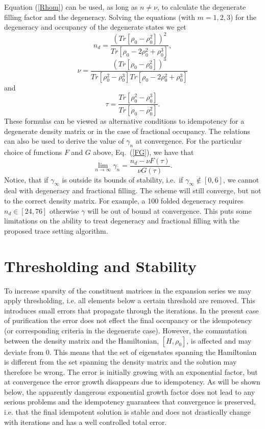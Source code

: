 \commentoutA{\documentclass[superbib,aps,prb,epsfig,floats,twocolumn]{revtex4}}
\begin{document}
Equation (\ref{Rhom}) can be used, as long as
$n \neq \nu$, to calculate the degenerate filling factor and the degeneracy.
Solving the equations (with $m=1,2,3$) for the degeneracy and occupancy
of the degenerate states we get
\begin{equation}
n_d = \frac{(Tr [\rho_0-\rho_0^2 ])^2}{Tr [\rho_0-2\rho_0^2+\rho_0^3 ]},
\end{equation}
\begin{equation}
\nu = \frac{(Tr [\rho_0-\rho_0^2 ])^3}{Tr [\rho_0^2-\rho_0^3 ]Tr [\rho_0-2\rho_0^2+\rho_0^3 ]}
\end{equation}
and
\begin{equation}
\tau = \frac{Tr [\rho_0^2-\rho_0^3 ]}{Tr [\rho_0-\rho_0^2 ]}.
\end{equation}
These formulas can be viewed as alternative conditions to idempotency
for a degenerate density matrix or in the case of fractional occupancy. 
The relations can also be used
to derive the value of $\gamma_n$ at convergence. For the particular
choice of functions $F$ and $G$ above, Eq.\ (\ref{FG}), we have that
\begin{equation}
\lim_{n \rightarrow \infty} \gamma_n = \frac{n_d - \nu F(\tau )}
                                               {\nu G(\tau )}.
\end{equation}
Notice, that if $\gamma_{\infty}$
is outside its bounds of stability, i.e.\ if $\gamma_{\infty} \notin [0,6]$, we cannot deal with
degeneracy and fractional filling. The scheme will still
converge, but not to the correct density matrix. For example,
a 100 folded degeneracy requires $n_d \in [24,76]$ otherwise
$\gamma$ will be out of bound at convergence. This puts some
limitations on the ability to treat degeneracy and fractional filling
with the proposed trace setting algorithm.


\section{Thresholding and Stability}

To increase sparsity of the constituent matrices in the expansion series
we may apply thresholding, i.e. all elements below a certain threshold
are removed. This introduces small errors that propagate through the
iterations. In the present case of purification the error does not
effect the final occupancy or the idempotency (or corresponding criteria
in the degenerate case). However, the commutation between the density
matrix and the Hamiltonian, $[H,\rho_0]$, is affected and may deviate from $0$. 
This means that the set of eigenstates spanning the Hamiltonian is different 
from the set spanning the density matrix and the solution may therefore be wrong.
The error is initially growing with an exponential factor, but at convergence
the error growth disappears due to idempotency.
As will be shown below, the apparently dangerous exponential 
growth factor does not lead to any serious problems and the idempotency
guarantees that convergence is preserved, i.e. that the final 
idempotent solution is stable and does not drastically change 
with iterations and has a well controlled total error.
\end{document}
